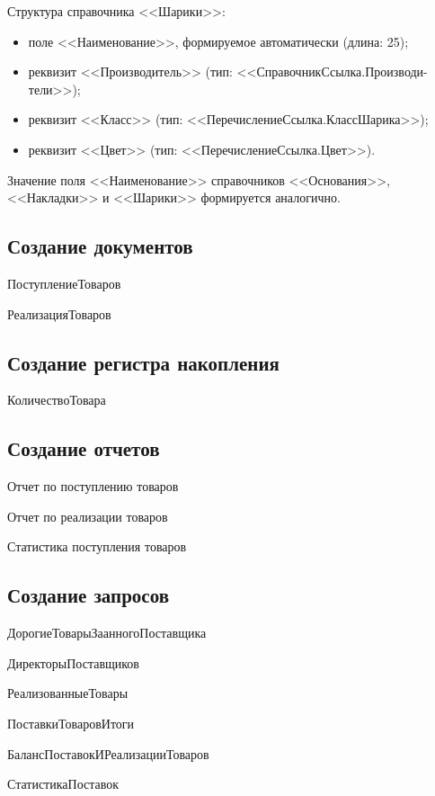 Структура справочника <<Шарики>>:
\begin{itemize}
\item поле <<Наименование>>, формируемое автоматически (длина: 25);
\item реквизит <<Производитель>> (тип: <<СправочникСсылка.Производи-тели>>);
\item реквизит <<Класс>> (тип: <<ПеречислениеСсылка.КлассШарика>>);
\item реквизит <<Цвет>> (тип: <<ПеречислениеСсылка.Цвет>>).
\end{itemize}

Значение поля <<Наименование>> справочников <<Основания>>, <<Накладки>> и <<Шарики>>
формируется аналогично.

\subsection{Создание документов}

ПоступлениеТоваров

РеализацияТоваров

\subsection{Создание регистра накопления}

КоличествоТовара

\subsection{Создание отчетов}

Отчет по поступлению товаров

Отчет по реализации товаров

Статистика поступления товаров

\subsection{Создание запросов}

ДорогиеТоварыЗаанногоПоставщика

ДиректорыПоставщиков

РеализованныеТовары

ПоставкиТоваровИтоги

БалансПоставокИРеализацииТоваров

СтатистикаПоставок